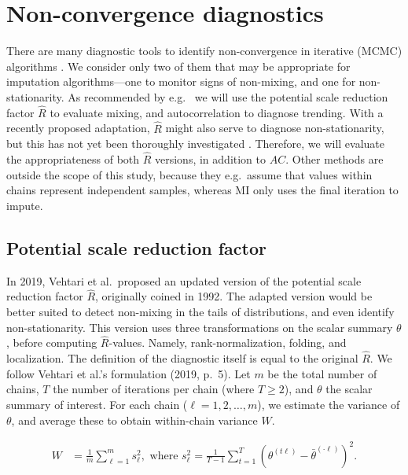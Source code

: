 \documentclass[Royal,times,sageh]{sagej}
\begin{document}
\hypertarget{non-convergence-diagnostics}{%
\section{Non-convergence diagnostics}\label{non-convergence-diagnostics}}

There are many diagnostic tools to identify non-convergence in iterative (MCMC) algorithms \citep{broo98, elad06}. We consider only two of them that may be appropriate for imputation algorithms---one to monitor signs of non-mixing, and one for non-stationarity. As recommended by e.g.~\citet{cowl96} we will use the potential scale reduction factor \(\widehat{R}\) \citep[`Gelman-Rubin statistic';][]{gelm92} to evaluate mixing, and autocorrelation \citep[\(AC\);][]{scha97, gelm13} to diagnose trending. With a recently proposed adaptation, \(\widehat{R}\) might also serve to diagnose non-stationarity, but this has not yet been thoroughly investigated \citep{veht19}. Therefore, we will evaluate the appropriateness of both \(\widehat{R}\) versions, in addition to \(AC\). Other methods are outside the scope of this study, because they e.g.~assume that values within chains represent independent samples, whereas MI only uses the final iteration to impute.

\hypertarget{potential-scale-reduction-factor}{%
\subsection{Potential scale reduction factor}\label{potential-scale-reduction-factor}}

In 2019, Vehtari et al.~proposed an updated version of the potential scale reduction factor \(\widehat{R}\), originally coined in 1992. The adapted version would be better suited to detect non-mixing in the tails of distributions, and even identify non-stationarity. This version uses three transformations on the scalar summary \(\theta\), before computing \(\widehat{R}\)-values. Namely, rank-normalization, folding, and localization. The definition of the diagnostic itself is equal to the original \(\widehat{R}\). We follow Vehtari et al.'s formulation (2019, p.~5). Let \(m\) be the total number of chains, \(T\) the number of iterations per chain (where \(T\geq2\)), and \(\theta\) the scalar summary of interest. For each chain (\(\ell = 1, 2, \dots, m\)), we estimate the variance of \(\theta\), and average these to obtain within-chain variance \(W\).

\begin{align*}
W&=\frac{1}{m} \sum_{\ell=1}^{m} s_{\ell}^{2}, \text { where } s_{\ell}^{2}=\frac{1}{T-1} \sum_{t=1}^{T}\left(\theta^{(t \ell)}-\bar{\theta}^{(\cdot \ell)}\right)^{2}. 
\end{align*}
\end{document}
